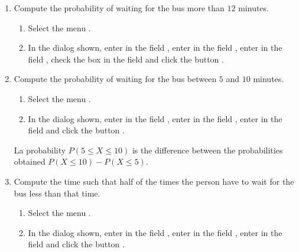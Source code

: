 \begin{enumerate}[leftmargin=*]
\begin{enumerate}
\item Compute the probability of waiting for the bus more than $12$ minutes.
\begin{indication}
\begin{enumerate}
\item Select the menu .
\item In the dialog shown, enter  in the field , enter  in the field , enter  in the field , check the box  in the field  and click the button .
\end{enumerate}
\end{indication}

\item Compute the probability of waiting for the bus between $5$ and $10$ minutes.
\begin{indication}
\begin{enumerate}
\item Select the menu .
\item In the dialog shown, enter  in the field , enter  in the field , enter  in the field  and click the button .
\end{enumerate}
La probability $P(5\leq X\leq 10)$ is the difference between the probabilities obtained $P(X\leq 10)-P(X\leq 5)$.
\end{indication}

\item Compute the time such that half of the times the person have to wait for the bus less than that time.
\begin{indication}
\begin{enumerate}
\item Select the menu .
\item In the dialog shown, enter  in the field ,
enter  in the field , enter  in the field  and click the button .
\end{enumerate}
\end{indication}


\end{enumerate}
\end{enumerate}
